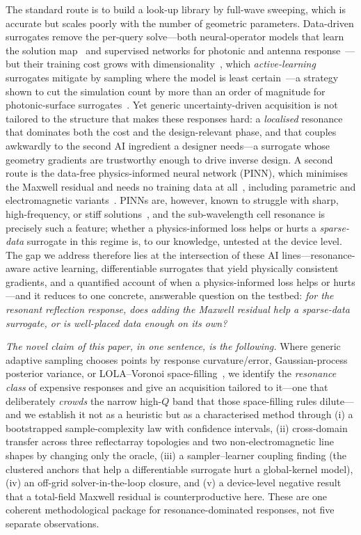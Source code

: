 \documentclass[11pt]{article}
\begin{document}
The standard route is to build a look-up library by full-wave sweeping, which is accurate but scales
poorly with the number of geometric parameters. Data-driven surrogates remove the per-query solve---both
neural-operator models that learn the solution map~\cite{ludeeponet2021,li2021fno,augenstein2023} and
supervised networks for photonic and antenna response~\cite{jiang2021,koziel2024surrogate}---but their
training cost grows with dimensionality~\cite{sarker2023mlreview}, which \emph{active-learning} surrogates mitigate by
sampling where the model is least certain~\cite{settles2012,lookman2019}---a strategy shown to cut the
simulation count by more than an order of magnitude for photonic-surface
surrogates~\cite{pestourie2020}. Yet generic
uncertainty-driven acquisition is not tailored to the structure that makes these responses hard: a
\emph{localised} resonance that dominates both the cost and the design-relevant phase, and that couples
awkwardly to the second AI ingredient a designer needs---a surrogate whose geometry gradients are
trustworthy enough to drive inverse design. A second route is the
data-free physics-informed neural network (PINN), which minimises the Maxwell residual and
needs no training data at all~\cite{raissi2019,karniadakis2021}, including parametric and electromagnetic
variants~\cite{beltran2022,nohra2024pinnem}. PINNs are,
however, known to struggle with sharp, high-frequency, or stiff
solutions~\cite{krishnapriyan2021,wang2021ntk,wanggrad2021}, and the sub-wavelength cell resonance is
precisely such a feature; whether a physics-informed loss helps or hurts a \emph{sparse-data} surrogate in
this regime is, to our knowledge, untested at the device level. The gap we address therefore lies
at the intersection of these AI lines---resonance-aware active learning, differentiable
surrogates that yield physically consistent gradients, and a quantified account of when a physics-informed
loss helps or hurts---and it reduces to one concrete, answerable question on the testbed: \emph{for
the resonant reflection response, does adding the Maxwell residual help a sparse-data surrogate, or is
well-placed data enough on its own?}

\emph{The novel claim of this paper, in one sentence, is the following.} Where generic adaptive sampling
chooses points by response curvature/error, Gaussian-process posterior variance, or LOLA--Voronoi
space-filling~\cite{settles2012,crombecq2011,gramacy2020}, we identify the \emph{resonance class} of
expensive responses and give an acquisition tailored to it---one that deliberately \emph{crowds} the narrow
high-$Q$ band that those space-filling rules dilute---and we establish it not as a heuristic but as a
characterised method through (i) a bootstrapped sample-complexity law with confidence intervals, (ii)
cross-domain transfer across three reflectarray topologies and two non-electromagnetic line shapes by
changing only the oracle, (iii) a sampler--learner coupling finding (the clustered anchors that help a
differentiable surrogate hurt a global-kernel model), (iv) an off-grid solver-in-the-loop closure, and (v)
a device-level negative result that a total-field Maxwell residual is counterproductive here. These are one
coherent methodological package for resonance-dominated responses, not five separate observations.
\end{document}
